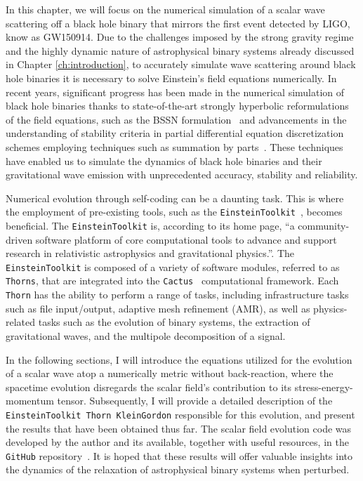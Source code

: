 In this chapter, we will focus on the numerical simulation of a scalar wave scattering off a black hole binary that mirrors the first event detected by LIGO, know as GW150914. Due to the challenges imposed by the strong gravity regime and the highly dynamic nature of astrophysical binary systems already discussed in Chapter \ref{ch:introduction}, to accurately simulate wave scattering around black hole binaries it is necessary to solve Einstein's field equations numerically. In recent years, significant progress has been made in the numerical simulation of black hole binaries thanks to state-of-the-art strongly hyperbolic reformulations of the field equations, such as the BSSN formulation~\cite{PhysRevD.52.5428,PhysRevD.59.024007} and advancements in the understanding of stability criteria in partial differential equation discretization schemes employing techniques such as summation by parts~\cite{Diener2007}. These techniques have enabled us to simulate the dynamics of black hole binaries and their gravitational wave emission with unprecedented accuracy, stability and reliability.

Numerical evolution through self-coding can be a daunting task. This is where the employment of pre-existing tools, such as the \texttt{EinsteinToolkit}~\cite{EinsteinToolkit:2022_11}, becomes beneficial. The \texttt{EinsteinToolkit} is, according to its home page, ``a community-driven software platform of core computational tools to advance and support research in relativistic astrophysics and gravitational physics.''. The \texttt{EinsteinToolkit} is composed of a variety of software modules, referred to as \texttt{Thorns}, that are integrated into the \texttt{Cactus}~\cite{Cactuscode:web,Cactusprize:web,Goodale:2002a} computational framework. Each \texttt{Thorn} has the ability to perform a range of tasks, including infrastructure tasks such as file input/output, adaptive mesh refinement (AMR), as well as physics-related tasks such as the evolution of binary systems, the extraction of gravitational waves, and the multipole decomposition of a signal.

In the following sections, I will introduce the equations utilized for the evolution of a scalar wave atop a numerically metric without back-reaction, where the spacetime evolution disregards the scalar field's contribution to its stress-energy-momentum tensor. Subsequently, I will provide a detailed description of the \texttt{EinsteinToolkit Thorn KleinGordon} responsible for this evolution, and present the results that have been obtained thus far. The scalar field evolution code was developed by the author and its available, together with useful resources, in the \texttt{GitHub} repository~\cite{FieldPerturbationsRepo}. It is hoped that these results will offer valuable insights into the dynamics of the relaxation of astrophysical binary systems when perturbed.